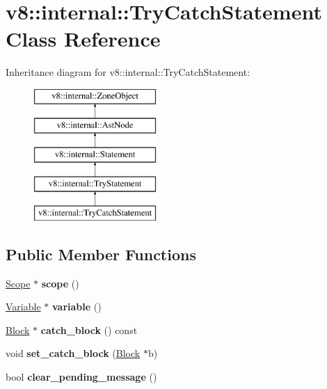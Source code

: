 \hypertarget{classv8_1_1internal_1_1_try_catch_statement}{}\section{v8\+:\+:internal\+:\+:Try\+Catch\+Statement Class Reference}
\label{classv8_1_1internal_1_1_try_catch_statement}
Inheritance diagram for v8\+:\+:internal\+:\+:Try\+Catch\+Statement\+:\begin{figure}[H]
\begin{center}
\leavevmode
\includegraphics[height=5.000000cm]{classv8_1_1internal_1_1_try_catch_statement}
\end{center}
\end{figure}
\subsection*{Public Member Functions}
\begin{DoxyCompactItemize}
\item 
\hyperlink{classv8_1_1internal_1_1_scope}{Scope} $\ast$ {\bfseries scope} ()\hypertarget{classv8_1_1internal_1_1_try_catch_statement_a73367297151c26a8c9d3e7d5068f4352}{}\label{classv8_1_1internal_1_1_try_catch_statement_a73367297151c26a8c9d3e7d5068f4352}

\item 
\hyperlink{classv8_1_1internal_1_1_variable}{Variable} $\ast$ {\bfseries variable} ()\hypertarget{classv8_1_1internal_1_1_try_catch_statement_a2e1ee9c034094a238bd539f2e8e916f2}{}\label{classv8_1_1internal_1_1_try_catch_statement_a2e1ee9c034094a238bd539f2e8e916f2}

\item 
\hyperlink{classv8_1_1internal_1_1_block}{Block} $\ast$ {\bfseries catch\+\_\+block} () const \hypertarget{classv8_1_1internal_1_1_try_catch_statement_ad5d572f993d4c67c341fd5074f0072b4}{}\label{classv8_1_1internal_1_1_try_catch_statement_ad5d572f993d4c67c341fd5074f0072b4}

\item 
void {\bfseries set\+\_\+catch\+\_\+block} (\hyperlink{classv8_1_1internal_1_1_block}{Block} $\ast$b)\hypertarget{classv8_1_1internal_1_1_try_catch_statement_a41a650282b7d4661e973fd94f728702f}{}\label{classv8_1_1internal_1_1_try_catch_statement_a41a650282b7d4661e973fd94f728702f}

\item 
bool {\bfseries clear\+\_\+pending\+\_\+message} ()\hypertarget{classv8_1_1internal_1_1_try_catch_statement_a26f1444615a6fd58799387c995a25cc5}{}\label{classv8_1_1internal_1_1_try_catch_statement_a26f1444615a6fd58799387c995a25cc5}

\end{DoxyCompactItemize}
